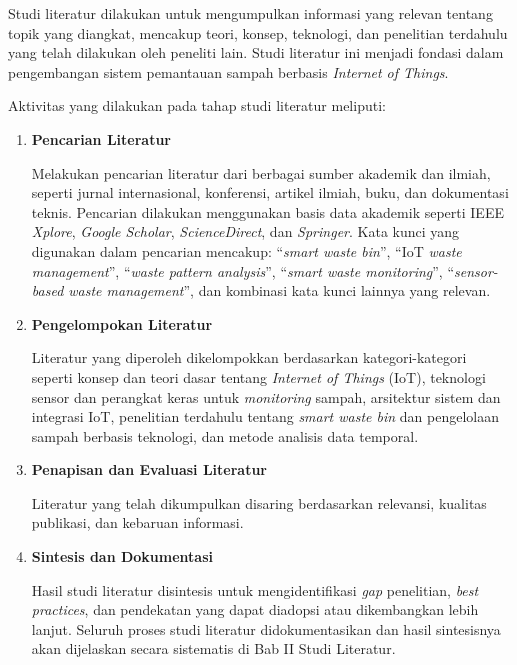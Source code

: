 Studi literatur dilakukan untuk mengumpulkan informasi yang relevan tentang topik yang diangkat, mencakup teori, konsep, teknologi, dan penelitian terdahulu yang telah dilakukan oleh peneliti lain. Studi literatur ini menjadi fondasi dalam pengembangan sistem pemantauan sampah berbasis \textit{Internet of Things}.

Aktivitas yang dilakukan pada tahap studi literatur meliputi:

\begin{enumerate}
    \item \textbf{Pencarian Literatur}

    Melakukan pencarian literatur dari berbagai sumber akademik dan ilmiah, seperti jurnal internasional, konferensi, artikel ilmiah, buku, dan dokumentasi teknis. Pencarian dilakukan menggunakan basis data akademik seperti IEEE \textit{Xplore}, \textit{Google Scholar}, \textit{ScienceDirect}, dan \textit{Springer}. Kata kunci yang digunakan dalam pencarian mencakup: ``\textit{smart waste bin}'', ``IoT \textit{waste management}'', ``\textit{waste pattern analysis}'', ``\textit{smart waste monitoring}'', ``\textit{sensor-based waste management}'', dan kombinasi kata kunci lainnya yang relevan.

    \item \textbf{Pengelompokan Literatur}

    Literatur yang diperoleh dikelompokkan berdasarkan kategori-kategori seperti konsep dan teori dasar tentang \textit{Internet of Things} (IoT), teknologi sensor dan perangkat keras untuk \textit{monitoring} sampah, arsitektur sistem dan integrasi IoT, penelitian terdahulu tentang \textit{smart waste bin} dan pengelolaan sampah berbasis teknologi, dan metode analisis data temporal.

    \item \textbf{Penapisan dan Evaluasi Literatur}

    Literatur yang telah dikumpulkan disaring berdasarkan relevansi, kualitas publikasi, dan kebaruan informasi.

    \item \textbf{Sintesis dan Dokumentasi}

    Hasil studi literatur disintesis untuk mengidentifikasi \textit{gap} penelitian, \textit{best practices}, dan pendekatan yang dapat diadopsi atau dikembangkan lebih lanjut. Seluruh proses studi literatur didokumentasikan dan hasil sintesisnya akan dijelaskan secara sistematis di Bab II Studi Literatur.
\end{enumerate}

